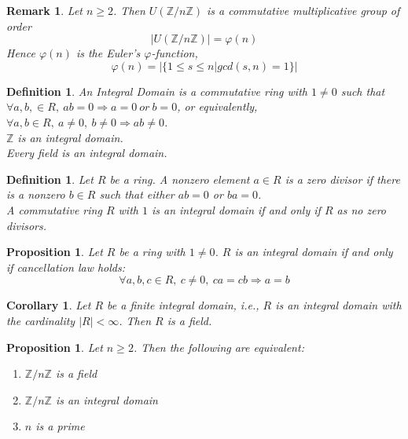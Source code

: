 \documentclass[a4paper,8pt]{article}
\theoremstyle{theorem}
\newtheorem{corollary}[theorem]{Corollary}
\newtheorem{proposition}[theorem]{Proposition}
\newtheorem{definition}[theorem]{Definition}
\newtheorem{remark}[theorem]{Remark}
\begin{document}
\begin{remark}
Let $n \geq 2$. Then $U(\mathbb{Z}/n\mathbb{Z})$ is a commutative multiplicative group of order 
\begin{equation}
\left| U(\mathbb{Z}/n\mathbb{Z}) \right| = \varphi (n) \nonumber
\end{equation}
Hence $\varphi (n)$ is the \textit{{\color{blue} Euler's $\varphi$-function}}, 
\begin{equation}
\varphi (n)=\left|\{1 \leq s \leq n | gcd(s, n) = 1\}\right| \nonumber
\end{equation}
\end{remark}


\begin{definition}
An \textit{{\color{blue} Integral Domain}} is a commutative ring with $1\neq 0$ such that $\forall a, b, \in R, \ ab = 0 \Rightarrow a=0 \ or \ b=0$,
or equivalently, $\forall a, b \in R, \ a \neq 0, \ b \neq 0 \Rightarrow ab \neq 0$.\\
$\mathbb{Z}$ is an integral domain.\\
Every field is an integral domain.\\
\end{definition}


\begin{definition}
Let $R$ be a ring. A nonzero element $a \in R$ is a 	\textit{{\color{blue} zero divisor}} if there is a nonzero $b\in R$ such that either $ab=0$ or $ba=0$.\\
A commutative ring $R$ with $1$ is an integral domain if and only if $R$ as no zero divisors.\\
\end{definition}


\begin{proposition}
Let $R$ be a ring with $1 \neq 0$. $R$ is an integral domain if and only if cancellation law holds: 
\begin{equation}
\forall a, b, c \in R, \ c \neq 0, \ ca=cb \Rightarrow a=b \nonumber
\end{equation}
\end{proposition}


\begin{corollary}
Let $R$ be a finite integral domain, i.e., $R$ is an integral domain with the cardinality $\left| R \right| < \infty$. Then $R$ is a field.\\
\end{corollary}


\begin{proposition}
Let $n \geq 2$. Then the following are equivalent:
\begin{enumerate}[label=(\roman*)]
\item $\mathbb{Z}/n\mathbb{Z}$ is a field
\item $\mathbb{Z}/n\mathbb{Z}$ is an integral domain
\item $n$ is a prime
\end{enumerate}
\end{proposition}
\end{document}
